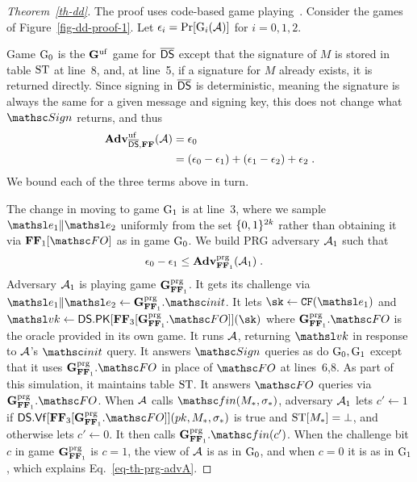 \begin{proof}[Theorem~\ref{th-dd}] The proof uses code-based game playing~\cite{EC:BelRog06}. Consider the games of Figure~\ref{fig-dd-proof-1}. Let $\epsilon_i = \Pr[\textnormal{G}_i(\mathcal{A})]$ for $i=0,1,2$. 

Game $\textnormal{G}_0$ is the $\mathbf{G}^{\mathrm{uf}}$ game for $\overline{\mathsf{DS}}$ except that the signature of $M$ is stored in table $\mathrm{ST}$ at line~8, and, at line~5, if a signature for $M$ already exists, it is returned directly. Since signing in $\overline{\mathsf{DS}}$ is deterministic, meaning the signature is always the same for a given message and signing key, this does not change what $\SignO$ returns, and thus
\begin{align*}
	\mathbf{Adv}^{\mathrm{uf}}_{\overline{\mathsf{DS}},\mathbf{FF}}(\mathcal{A}) &=  \epsilon_0 \\
	&= (\epsilon_0-\epsilon_1)+(\epsilon_1-\epsilon_2)+\epsilon_2 \;.
\end{align*}
We bound each of the three terms above in turn.

The change in moving to game $\textnormal{G}_1$ is at line~3, where we sample $\eEDSA_1\|\eEDSA_2$ uniformly from the set $\{0,1\}^{2k}$ rather than obtaining it via $\fF_1[\HASH]$ as in game $\textnormal{G}_0$. We build PRG adversary $\mathcal{A}_1$ such that 
\begin{align}
	\epsilon_0-\epsilon_1 & \leq 
	\mathbf{Adv}^{\mathrm{prg}}_{\mathbf{FF}_1}(\mathcal{A}_1)\;. \label{eq-th-prg-advA}
\end{align}
Adversary $\mathcal{A}_1$ is playing game $\mathbf{G}^{\mathrm{prg}}_{\mathbf{FF}_1}$. It gets its challenge via $\eEDSA_1\|\eEDSA_2 \gets \gamePRG_{\fF_1}.\Initialize$. It lets $\sk\gets\CFEDSA(\eEDSA_1)$ and $\vk\gets\DS.\MakePK[\fF_3[\gamePRG_{\fF_1}.\HASH]](\sk)$ where $\gamePRG_{\fF_1}.\HASH$ is the oracle provided in its own game. It runs $\mathcal{A}$, returning $\vk$ in response to $\mathcal{A}$'s $\Initialize$ query. It answers $\SignO$ queries as do $\textnormal{G}_0,\textnormal{G}_1$ except that it uses $\gamePRG_{\fF_1}.\HASH$ in place of $\HASH$ at lines~6,8. As part of this simulation, it maintains table $\mathrm{ST}$. It answers $\HASH$ queries via $\gamePRG_{\fF_1}.\HASH$. When $\mathcal{A}$ calls $\Finalize(\chmsg, \chsig)$, adversary $\mathcal{A}_1$ lets $c'\gets 1$ if $\DS.\Vf[\fF_3[\gamePRG_{\fF_1}.\HASH]](\pk, \chmsg, \chsig)$ is true and $\mathrm{ST}[{M}_*]=\bot$, and otherwise lets $c'\gets 0$. It then calls $\gamePRG_{\fF_1}.\Finalize(c')$. When the challenge bit $c$ in game $\mathbf{G}^{\mathrm{prg}}_{\mathbf{FF}_1}$ is $c=1$, the view of $\mathcal{A}$ is as in $\textnormal{G}_0$, and when $c=0$ it is as in $\textnormal{G}_1$, which explains Eq.~\eqref{eq-th-prg-advA}.


\end{proof}
